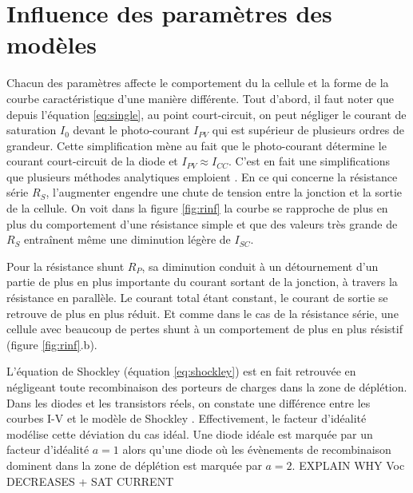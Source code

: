 \section{Influence des paramètres des modèles}
Chacun des paramètres affecte le comportement du la cellule et la forme de la courbe caractéristique d'une manière différente. Tout d'abord, il faut noter que depuis l'équation \ref{eq:single}, au point court-circuit, on peut négliger le courant de saturation $I_0$ devant le photo-courant $I_{PV}$ qui est supérieur de plusieurs ordres de grandeur. Cette simplification mène au fait que le photo-courant détermine le courant court-circuit de la diode et $I_{PV} \approx I_{CC}$. C'est en fait une simplifications que plusieurs méthodes analytiques emploient \cite{Tsai2008, Villalva2009}. En ce qui concerne la résistance série $R_S$, l'augmenter engendre une chute de tension entre la jonction et la sortie de la cellule. On voit dans la figure \ref{fig:rinf} la courbe se rapproche de plus en plus du comportement d'une résistance simple et que des valeurs très grande de $R_S$ entraînent même une diminution légère de $I_{SC}$.

Pour la résistance shunt $R_P$, sa diminution conduit à un détournement d'un partie de plus en plus importante du courant sortant de la jonction, à travers la résistance en parallèle. Le courant total étant constant, le courant de sortie se retrouve de plus en plus réduit. Et comme dans le cas de la résistance série, une cellule avec beaucoup de pertes shunt à un comportement de plus en plus résistif (figure \ref{fig:rinf}.b).

L'équation de Shockley (équation \ref{eq:shockley}) est en fait retrouvée en négligeant toute recombinaison des porteurs de charges dans la zone de déplétion. Dans les diodes et les transistors réels, on constate une différence entre les courbes I-V et le modèle de Shockley \cite{Shockley1949}. Effectivement, le facteur d'idéalité modélise cette déviation du cas idéal. Une diode idéale est marquée par un facteur d'idéalité $a = 1$ alors qu'une diode où les évènements de recombinaison dominent dans la zone de déplétion est marquée par $a = 2$. EXPLAIN WHY Voc DECREASES + SAT CURRENT

